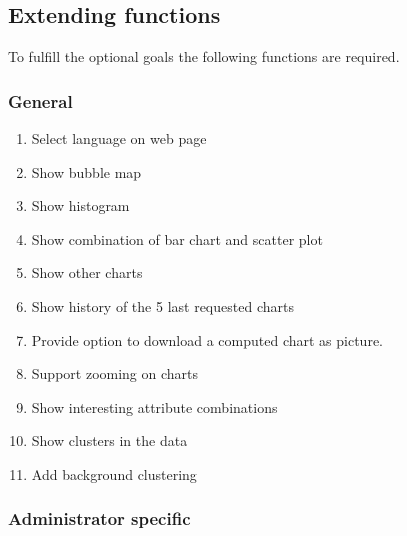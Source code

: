 \subsection{Extending functions}

To fulfill the optional goals the following functions are required.

\subsubsection*{General}
\begin{enumerate}[resume*=func]
  
  \item Select language on web page \label{f22}
  
  \item Show \gls{bubble map} \label{f23}
  
  \item Show histogram \label{f27}
  
  \item Show combination of \gls{bar chart} and \gls{scatter plot} \label{f24}
  
  \item Show other \glspl{chart} \label{f25}
  
  \item Show history of the 5 last requested \glspl{chart}  \label{f26}
  
  \item Provide option to download a computed chart as picture.
  
  \item Support zooming on charts
  \item Show interesting attribute combinations

  \item Show clusters in the data
  
  \item Add background clustering
  


 
\end{enumerate}


\subsubsection*{Administrator specific}

